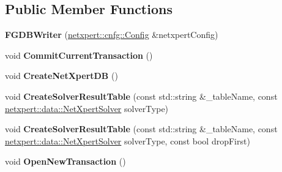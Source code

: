 \subsection*{Public Member Functions}
\begin{DoxyCompactItemize}
\item 
{\bfseries F\+G\+D\+B\+Writer} (\hyperlink{structnetxpert_1_1cnfg_1_1Config}{netxpert\+::cnfg\+::\+Config} \&netxpert\+Config)\hypertarget{classnetxpert_1_1io_1_1FGDBWriter_aa61e7d22c7bf7c12400c830a712ff5ab}{}\label{classnetxpert_1_1io_1_1FGDBWriter_aa61e7d22c7bf7c12400c830a712ff5ab}

\item 
void {\bfseries Commit\+Current\+Transaction} ()\hypertarget{classnetxpert_1_1io_1_1FGDBWriter_a18e8afe6996ff6cc492cd41134998068}{}\label{classnetxpert_1_1io_1_1FGDBWriter_a18e8afe6996ff6cc492cd41134998068}

\item 
void {\bfseries Create\+Net\+Xpert\+DB} ()\hypertarget{classnetxpert_1_1io_1_1FGDBWriter_ae99c6ad785d867ae2978f447ce96a2b6}{}\label{classnetxpert_1_1io_1_1FGDBWriter_ae99c6ad785d867ae2978f447ce96a2b6}

\item 
void {\bfseries Create\+Solver\+Result\+Table} (const std\+::string \&\+\_\+table\+Name, const \hyperlink{namespacenetxpert_1_1data_a923ee7cb7eab8b9dbfd62fb6d26f51cb}{netxpert\+::data\+::\+Net\+Xpert\+Solver} solver\+Type)\hypertarget{classnetxpert_1_1io_1_1FGDBWriter_a76e57985a136af8618f36e480525b3d2}{}\label{classnetxpert_1_1io_1_1FGDBWriter_a76e57985a136af8618f36e480525b3d2}

\item 
void {\bfseries Create\+Solver\+Result\+Table} (const std\+::string \&\+\_\+table\+Name, const \hyperlink{namespacenetxpert_1_1data_a923ee7cb7eab8b9dbfd62fb6d26f51cb}{netxpert\+::data\+::\+Net\+Xpert\+Solver} solver\+Type, const bool drop\+First)\hypertarget{classnetxpert_1_1io_1_1FGDBWriter_a640ffa09d53425d1823fd98a5faaaa90}{}\label{classnetxpert_1_1io_1_1FGDBWriter_a640ffa09d53425d1823fd98a5faaaa90}

\item 
void {\bfseries Open\+New\+Transaction} ()\hypertarget{classnetxpert_1_1io_1_1FGDBWriter_a71bd85819e7a1ca4097cc845b03f3806}{}\label{classnetxpert_1_1io_1_1FGDBWriter_a71bd85819e7a1ca4097cc845b03f3806}


\end{DoxyCompactItemize}
